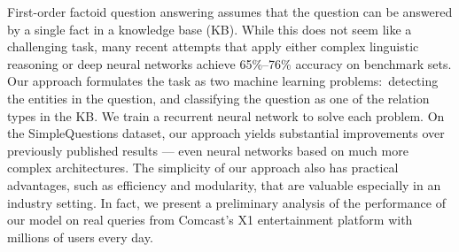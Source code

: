 First-order factoid question answering assumes that the question can be answered by a single fact in a knowledge base (KB). While this does not seem like a challenging task, many recent attempts that apply either complex linguistic reasoning or deep neural networks achieve 65\%--76\% accuracy on benchmark sets. Our approach formulates the task as two machine learning problems:\ detecting the entities in the question, and classifying the question as one of the relation types in the KB. We train a recurrent neural network to solve each problem. On the SimpleQuestions dataset, our approach yields substantial improvements over previously published results --- even neural networks based on much more complex architectures. The simplicity of our approach also has practical advantages, such as efficiency and modularity, that are valuable especially in an industry setting. In fact, we present a preliminary analysis of the performance of our model on real queries from Comcast's X1 entertainment platform with millions of users every day.
